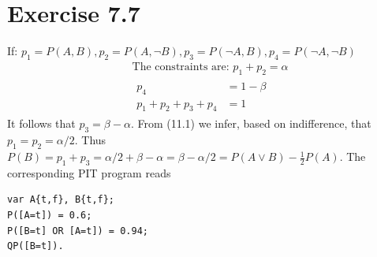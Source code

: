 \documentclass[10pt]{book}
\begin{document}
\section{Exercise 7.7}
If: $p_{1}=P(A, B), p_{2}=P(A, \neg B), p_{3}=P(\neg A, B), p_{4}=P(\neg A, \neg B)$
\[
\begin{aligned}
& \text{The constraints are: } p_{1}+p_{2}=\alpha \tag{11.1}\\
& \begin{aligned}
p_{4} & =1-\beta \\
p_{1}+p_{2}+p_{3}+p_{4} & =1
\end{aligned} \tag{11.2}
\end{aligned}
\]
It follows that $p_{3}=\beta-\alpha$. From (11.1) we infer, based on indifference, that $p_{1}=p_{2}=\alpha / 2$. Thus $P(B)=p_{1}+p_{3}=\alpha / 2+\beta-\alpha=\beta-\alpha / 2=P(A \vee B)-\frac{1}{2}P(A)$. The corresponding PIT program reads
\begin{verbatim}
var A{t,f}, B{t,f};
P([A=t]) = 0.6;
P([B=t] OR [A=t]) = 0.94;
QP([B=t]).
\end{verbatim}
\end{document}
